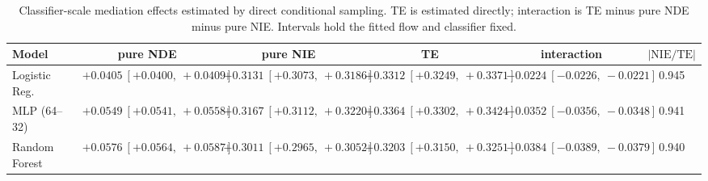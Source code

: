 \begin{table}[htbp]
  \centering
  \caption{Classifier-scale mediation effects estimated by direct conditional sampling. TE is estimated directly; interaction is TE minus pure NDE minus pure NIE. Intervals hold the fitted flow and classifier fixed.}
  \label{tab:german_synth_m2_gap_overall}
  \begin{tabular}{lccccc}
    \toprule
    Model & pure NDE & pure NIE & TE & interaction & $|\mathrm{NIE}/\mathrm{TE}|$ \\
    \midrule
    Logistic Reg. & $+0.0405\ [+0.0400,\ +0.0409]$ & $+0.3131\ [+0.3073,\ +0.3186]$ & $+0.3312\ [+0.3249,\ +0.3371]$ & $-0.0224\ [-0.0226,\ -0.0221]$ & 0.945 \\
    MLP (64--32) & $+0.0549\ [+0.0541,\ +0.0558]$ & $+0.3167\ [+0.3112,\ +0.3220]$ & $+0.3364\ [+0.3302,\ +0.3424]$ & $-0.0352\ [-0.0356,\ -0.0348]$ & 0.941 \\
    Random Forest & $+0.0576\ [+0.0564,\ +0.0587]$ & $+0.3011\ [+0.2965,\ +0.3052]$ & $+0.3203\ [+0.3150,\ +0.3251]$ & $-0.0384\ [-0.0389,\ -0.0379]$ & 0.940 \\
    \bottomrule
  \end{tabular}
\end{table}